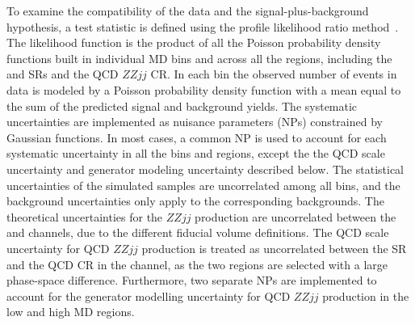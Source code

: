 To examine the compatibility of the data and the signal-plus-background hypothesis, a test statistic is defined using the profile likelihood ratio method~\cite{cowan:Asymptotic2013}.  The likelihood function is the product of all the Poisson probability density functions built in individual MD bins and across all the regions, including the \lllljj and \llvvjj SRs and the \lllljj QCD $ZZjj$ CR. In each bin the observed number of events in data is modeled by a Poisson probability density function with a mean equal to the sum of the predicted signal and background yields. The systematic uncertainties are implemented as nuisance parameters (NPs) constrained by Gaussian functions. In most cases, a common NP is used to account for each systematic uncertainty in all the bins and regions, except the the QCD scale uncertainty and generator modeling uncertainty described below. The statistical uncertainties of the simulated samples are uncorrelated among all bins, and the background uncertainties only apply to the corresponding backgrounds. The theoretical uncertainties for the $ZZjj$ production are uncorrelated between the \lllljj and \llvvjj channels, due to the different fiducial volume definitions. The QCD scale uncertainty for QCD $ZZjj$ production is treated as uncorrelated between the SR and the QCD CR in the \lllljj channel, as the two regions are selected with a large phase-space difference. Furthermore, two separate NPs are implemented to account for the generator modelling uncertainty for QCD $ZZjj$ production in the low and high MD regions.

